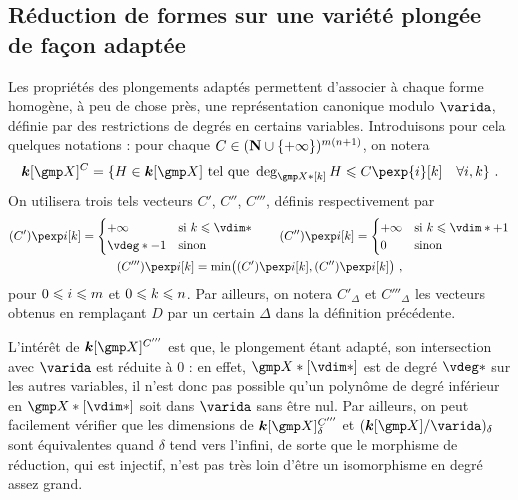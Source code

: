 
\subsection{Réduction de formes sur une variété plongée de façon adaptée}
\label{sec:rfull}

Les propriétés des plongements adaptés permettent d'associer à chaque forme
homogène, à peu de chose près, une représentation canonique modulo \( \varida
\), définie par des restrictions de degrés en certains variables.
Introduisons pour cela quelques notations : pour chaque $C \in ({\mathbf{N}} \cup \lbrace
  +\infty \rbrace) ^{m(n+1)}$, on notera
\begin{equation} \label{e:C-spaces}
  \cdn[\vmp]^C
  = \{
    H \in \cdn[\vmp]
    \text{ tel que }
    \deg_{\vmp*[k]} H \le C\pexp{\fct}[k]
    \quad \forall i, k
    \}
  \pmm.
\end{equation}
On utilisera trois tels vecteurs $C'$, $C''$, $C'''$, définis respectivement
par
\begin{gather} \label{e:C-i-iii}
  (C')\pexp\fct[\ind] =
  \begin{cases}
    +\infty & \text{si $\ind \le \vdim*$} \\
    \vdeg* - 1 & \text{sinon}
  \end{cases}
  \qquad
  (C'')\pexp\fct[\ind] =
  \begin{cases}
    +\infty & \text{si $\ind \le \vdim* + 1$} \\
    0 & \text{sinon}
  \end{cases}
  \\
  (C''')\pexp\fct[\ind] = \min\bigl(
    (C')\pexp\fct[\ind], (C'')\pexp\fct[\ind]
  \bigr)
  \pmm,
\end{gather}
pour $0 \leqslant i \leqslant m$ et $0 \leqslant k \leqslant n$.  Par ailleurs, on notera
$C'_\Delta$ et $C'''_\Delta$ les vecteurs obtenus en remplaçant $D$ par un
certain $\Delta$ dans la définition précédente.

L'intérêt de \( \cdn[ \vmp ]^{C'''} \) est que, le plongement étant
adapté, son intersection avec \( \varida \) est réduite à \( 0 \) : en effet,
\( \vmp*[\vdim*] \) est de degré \( \vdeg* \) sur les autres variables, il
n'est donc pas possible qu'un polynôme de degré inférieur en \( \vmp*[\vdim*]
\) soit dans \( \varida \) sans être nul. Par ailleurs, on peut facilement
vérifier que les dimensions de \( \cdn[ \vmp ]^{C'''}_{\delta} \) et \(
  ( \cdn[\vmp] / \varida )_\delta \) sont équivalentes quand \( \delta \) tend
vers l'infini, de sorte que le morphisme de réduction, qui est injectif, n'est
pas très loin d'être un isomorphisme en degré assez grand.

